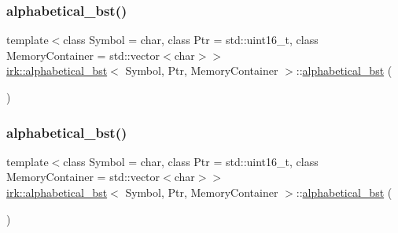 \subsubsection{\texorpdfstring{alphabetical\+\_\+bst()}{alphabetical\_bst()}\hspace{0.1cm}{\footnotesize\ttfamily [2/4]}}
{\footnotesize\ttfamily template$<$class Symbol = char, class Ptr = std\+::uint16\+\_\+t, class Memory\+Container = std\+::vector$<$char$>$$>$ \\
\mbox{\hyperlink{classirk_1_1alphabetical__bst}{irk\+::alphabetical\+\_\+bst}}$<$ Symbol, Ptr, Memory\+Container $>$\+::\mbox{\hyperlink{classirk_1_1alphabetical__bst}{alphabetical\+\_\+bst}} (\begin{DoxyParamCaption}{ }\end{DoxyParamCaption})\hspace{0.3cm}{\ttfamily [default]}}

\mbox{\label{classirk_1_1alphabetical__bst_a39fbd9f70b56a343b43e529621885f5a}} 
\subsubsection{\texorpdfstring{alphabetical\+\_\+bst()}{alphabetical\_bst()}\hspace{0.1cm}{\footnotesize\ttfamily [3/4]}}
{\footnotesize\ttfamily template$<$class Symbol = char, class Ptr = std\+::uint16\+\_\+t, class Memory\+Container = std\+::vector$<$char$>$$>$ \\
\mbox{\hyperlink{classirk_1_1alphabetical__bst}{irk\+::alphabetical\+\_\+bst}}$<$ Symbol, Ptr, Memory\+Container $>$\+::\mbox{\hyperlink{classirk_1_1alphabetical__bst}{alphabetical\+\_\+bst}} (\begin{DoxyParamCaption}\item[{const \mbox{\hyperlink{classirk_1_1alphabetical__bst}{alphabetical\+\_\+bst}}$<$ Symbol, Ptr, Memory\+Container $>$ \&}]{ }\end{DoxyParamCaption})\hspace{0.3cm}{\ttfamily [default]}}

\mbox{\label{classirk_1_1alphabetical__bst_a783898827b1315ae59daf77d31f10d97}} 
